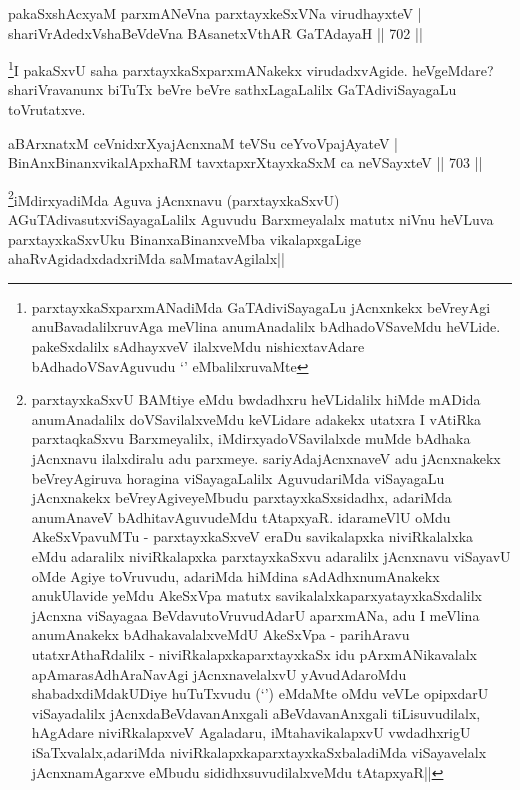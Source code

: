 \begin{shl}
pakaSxshAcxyaM parxmANeVna parxtayxkeSxVNa virudhayxteV | \\
shariVrAdedxVshaBeVdeVna BAsanetxV\s thAR GaTAdayaH \hfill||  702 ||  
\end{shl}

\begin{artha}
\footnote{parxtayxkaSxparxmANadiMda GaTAdiviSayagaLu jAcnxnkekx beVreyAgi anuBavadalilxruvAga meVlina anumAnadalilx bAdhadoVSaveMdu heVLide. pakeSxdalilx sAdhayxveV ilalxveMdu nishicxtavAdare bAdhadoVSavAguvudu `\stext' eMbalilxruvaMte}I pakaSxvU saha parxtayxkaSxparxmANakekx virudadxvAgide. heVgeMdare? shariVravanunx biTuTx beVre beVre sathxLagaLalilx GaTAdiviSayagaLu toVrutatxve.
\end{artha}

\begin{shl}
aBArxnatxM ceVnidxrXyajAcnxnaM teVSu ceYvoVpajAyateV | \\
BinAnxBinanxvikalApxhaRM tavxtapxrXtayxkaSxM ca neVSayxteV \hfill||  703 ||  
\end{shl}

\begin{artha}
\footnote{parxtayxkaSxvU BAMtiye eMdu bwdadhxru heVLidalilx hiMde mADida anumAnadalilx doVSavilalxveMdu keVLidare adakekx utatxra I vAtiRka parxtaqkaSxvu Barxmeyalilx, iMdirxyadoVSavilalxde muMde bAdhaka jAcnxnavu ilalxdiralu adu parxmeye. sariyAdajAcnxnaveV adu jAcnxnakekx beVreyAgiruva horagina viSayagaLalilx AguvudariMda viSayagaLu jAcnxnakekx beVreyAgiveyeMbudu parxtayxkaSxsidadhx, adariMda anumAnaveV bAdhitavAguvudeMdu tAtapxyaR. idarameVlU oMdu AkeSxVpavuMTu - parxtayxkaSxveV eraDu savikalapxka niviRkalalxka eMdu adaralilx niviRkalapxka parxtayxkaSxvu adaralilx jAcnxnavu viSayavU oMde Agiye toVruvudu, adariMda hiMdina sAdAdhxnumAnakekx anukUlavide yeMdu AkeSxVpa matutx savikalalxkaparxyatayxkaSxdalilx jAcnxna viSayagaa BeVdavutoVruvudAdarU aparxmANa, adu I meVlina anumAnakekx bAdhakavalalxveMdU AkeSxVpa - parihAravu utatxrAthaRdalilx - niviRkalapxkaparxtayxkaSx idu pArxmANikavalalx apAmarasAdhAraNavAgi jAcnxnavelalxvU yAvudAdaroMdu shabadxdiMdakUDiye huTuTxvudu (`\stext') eMdaMte oMdu veVLe opipxdarU viSayadalilx jAcnxdaBeVdavanAnxgali aBeVdavanAnxgali tiLisuvudilalx, hAgAdare niviRkalapxveV Agaladaru, iMtahavikalapxvU vwdadhxrigU iSaTxvalalx,adariMda niviRkalapxkaparxtayxkaSxbaladiMda viSayavelalx jAcnxnamAgarxve eMbudu sididhxsuvudilalxveMdu tAtapxyaR||}iMdirxyadiMda Aguva jAcnxnavu (parxtayxkaSxvU) AGuTAdivasutxviSayagaLalilx Aguvudu Barxmeyalalx matutx niVnu heVLuva parxtayxkaSxvUku BinanxaBinanxveMba vikalapxgaLige ahaRvAgidadxdadxriMda saMmatavAgilalx||
\end{artha}

